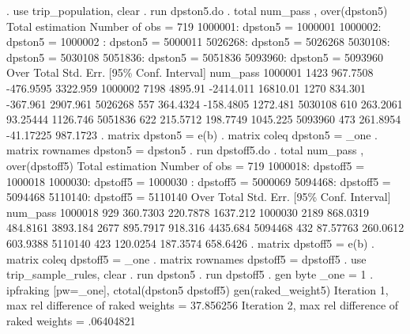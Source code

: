 . use trip_population, clear
{\smallskip}
. run dpston5.do
{\smallskip}
. total num_pass , over(dpston5)
{\smallskip}
Total estimation                  Number of obs   =        719
{\smallskip}
      1000001: dpston5 = 1000001
      1000002: dpston5 = 1000002
\smallskip
\oom
{}: dpston5 = 5000011
      5026268: dpston5 = 5026268
      5030108: dpston5 = 5030108
      5051836: dpston5 = 5051836
      5093960: dpston5 = 5093960
{\smallskip}
        Over {\VBAR}      Total   Std. Err.     [95\% Conf. Interval]
num_pass     {\VBAR}
     1000001 {\VBAR}       1423   967.7508     -476.9595    3322.959
     1000002 {\VBAR}       7198    4895.91     -2414.011    16810.01
\smallskip
\oom
{} {\VBAR}       1270    834.301      -367.961    2907.961
     5026268 {\VBAR}        557   364.4324     -158.4805    1272.481
     5030108 {\VBAR}        610   263.2061      93.25444    1126.746
     5051836 {\VBAR}        622   215.5712      198.7749    1045.225
     5093960 {\VBAR}        473   261.8954     -41.17225    987.1723
{\smallskip}
. matrix dpston5 = e(b)
{\smallskip}
. matrix coleq dpston5 = _one
{\smallskip}
. matrix rownames dpston5 = dpston5
{\smallskip}
. run dpstoff5.do
{\smallskip}
. total num_pass , over(dpstoff5)
{\smallskip}
Total estimation                  Number of obs   =        719
{\smallskip}
      1000018: dpstoff5 = 1000018
      1000030: dpstoff5 = 1000030
\smallskip
\oom
{}: dpstoff5 = 5000069
      5094468: dpstoff5 = 5094468
      5110140: dpstoff5 = 5110140
{\smallskip}
        Over {\VBAR}      Total   Std. Err.     [95\% Conf. Interval]
num_pass     {\VBAR}
     1000018 {\VBAR}        929   360.7303      220.7878    1637.212
     1000030 {\VBAR}       2189   868.0319      484.8161    3893.184
\smallskip
\oom
{} {\VBAR}       2677   895.7917       918.316    4435.684
     5094468 {\VBAR}        432   87.57763      260.0612    603.9388
     5110140 {\VBAR}        423   120.0254      187.3574    658.6426
{\smallskip}
. matrix dpstoff5 = e(b)
{\smallskip}
. matrix coleq dpstoff5 = _one
{\smallskip}
. matrix rownames dpstoff5 = dpstoff5
{\smallskip}
. use trip_sample_rules, clear
{\smallskip}
. run dpston5
{\smallskip}
. run dpstoff5
{\smallskip}
. gen byte _one = 1
{\smallskip}
. ipfraking [pw=_one], ctotal(dpston5 dpstoff5) gen(raked_weight5)
{\smallskip}
 Iteration 1, max rel difference of raked weights = 37.856256
 Iteration 2, max rel difference of raked weights = .06404821
